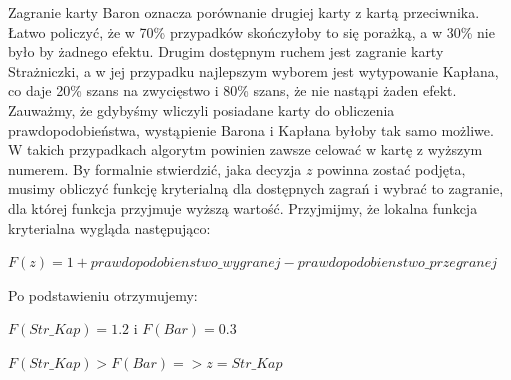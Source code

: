 Zagranie karty Baron oznacza porównanie drugiej karty z kartą przeciwnika. Łatwo policzyć, że w 70\% przypadków skończyłoby to się porażką, a w 30\% nie było by żadnego efektu. Drugim dostępnym ruchem jest zagranie karty Strażniczki, a w jej przypadku najlepszym wyborem jest wytypowanie Kapłana, co daje 20\% szans na zwycięstwo i 80\% szans, że nie nastąpi żaden efekt. Zauważmy, że gdybyśmy wliczyli posiadane karty do obliczenia prawdopodobieństwa, wystąpienie Barona i Kapłana byłoby tak samo możliwe. W takich przypadkach algorytm powinien zawsze celować w kartę z wyższym numerem. By formalnie stwierdzić, jaka decyzja $z$ powinna zostać podjęta, musimy obliczyć funkcję kryterialną dla dostępnych zagrań i wybrać to zagranie, dla której funkcja przyjmuje wyższą wartość. Przyjmijmy, że lokalna funkcja kryterialna wygląda następująco:

\begin{center}
	$F(z) = 1 + prawdopodobienstwo\_wygranej - prawdopodobienstwo\_przegranej$
\end{center}
Po podstawieniu otrzymujemy:
\begin{center}
 $F(Str\_Kap)=1.2$ i $F(Bar) = 0.3$
 
 $F(Str\_Kap)>F(Bar) => z = Str\_Kap$ 
\end{center} 

